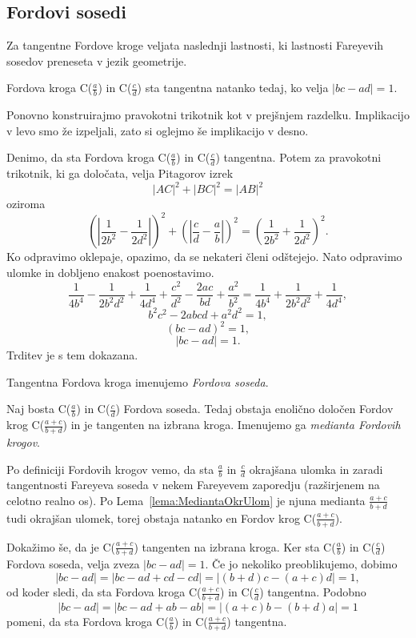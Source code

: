 \documentclass[mat1]{fmfdelo}
\begin{document}
\subsection{Fordovi sosedi}
%
Za tangentne Fordove kroge veljata naslednji lastnosti, ki lastnosti Fareyevih sosedov preneseta v jezik geometrije.

\begin{trditev}
\label{trd:FordTangentnost}
Fordova kroga C($\frac{a}{b}$) in C($\frac{c}{d}$) sta tangentna natanko tedaj, ko velja \( |bc-ad|=1. \)
\end{trditev}

\begin{dokaz}
%
Ponovno konstruirajmo pravokotni trikotnik kot v prejšnjem razdelku. Implikacijo v levo smo že izpeljali, zato si oglejmo še implikacijo v desno.

Denimo, da sta Fordova kroga C($\frac{a}{b}$) in C($\frac{c}{d}$) tangentna. Potem za pravokotni trikotnik, ki ga določata, velja Pitagorov izrek 
\[ |AC|^2 + |BC|^2 = |AB|^2 \] oziroma
\[ \left ( \left | \frac{1}{2b^2} - \frac{1}{2d^2} \right | \right )^2 + \left ( \left| \frac{c}{d} - \frac{a}{b} \right| \right )^2 = \left (\frac{1}{2b^2} + \frac{1}{2d^2} \right )^2. \]
Ko odpravimo oklepaje, opazimo, da se nekateri členi odštejejo. Nato odpravimo ulomke in dobljeno enakost poenostavimo.
\[ \frac{1}{4b^4} - \frac{1}{2b^{2}d^{2}} + \frac{1}{4d^4} + \frac{c^2}{d^2} - \frac{2ac}{bd} + \frac{a^2}{b^2} = \frac{1}{4b^4} + \frac{1}{2b^{2}d^{2}} + \frac{1}{4d^4}, \]
\[ b^{2}c^{2} - 2abcd + a^{2}d^{2} = 1, \]
\[  (bc-ad)^2 = 1, \]
\[ |bc-ad|=1. \]
Trditev je s tem dokazana.
\end{dokaz}

\begin{definicija}
Tangentna Fordova kroga imenujemo \emph{Fordova soseda}.
\end{definicija}

\begin{trditev}
Naj bosta C($\frac{a}{b}$) in C($\frac{c}{d}$) Fordova soseda. Tedaj obstaja enolično določen Fordov krog C($\frac{a+c}{b+d}$) in je tangenten na izbrana kroga. Imenujemo ga \emph{medianta Fordovih krogov}.
\end{trditev}

\begin{dokaz}
Po definiciji Fordovih krogov vemo, da sta $\frac{a}{b}$ in $\frac{c}{d}$ okrajšana ulomka in zaradi tangentnosti Fareyeva soseda v nekem Fareyevem zaporedju (razširjenem na celotno realno os). Po Lema~\ref{lema:MediantaOkrUlom} je njuna medianta $\frac{a+c}{b+d}$ tudi okrajšan ulomek, torej obstaja natanko en Fordov krog C($\frac{a+c}{b+d}$). 

Dokažimo še, da je C($\frac{a+c}{b+d}$) tangenten na izbrana kroga. Ker sta C($\frac{a}{b}$) in C($\frac{c}{d}$) Fordova soseda, velja zveza 
\( |bc-ad|=1. \)
Če jo nekoliko preoblikujemo, dobimo
\[ |bc-ad|=|bc-ad+cd-cd|=|(b+d)c-(a+c)d|=1, \]
od koder sledi, da sta Fordova kroga C($\frac{a+c}{b+d}$) in C($\frac{c}{d}$) tangentna.
Podobno
\[ |bc-ad|=|bc-ad+ab-ab|=|(a+c)b-(b+d)a|=1 \]
pomeni, da sta Fordova kroga C($\frac{a}{b}$) in C($\frac{a+c}{b+d}$) tangentna.
\end{dokaz}
\end{document}
